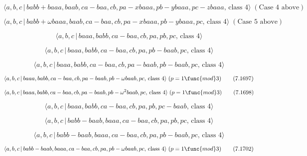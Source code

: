 \documentclass[10pt]{article}
\begin{document}
\begin{equation}
\langle a,b,c\,|\,babb+baaa,baab,ca-baa,cb,pa-xbaaa,pb-ybaaa,pc-zbaaa,\,%
\text{class }4\rangle \;(\text{Case 4 above})  \tag{7.1692}
\end{equation}

\begin{equation}
\langle a,b,c\,|\,babb+\omega baaa,baab,ca-baa,cb,pa-xbaaa,pb-ybaaa,pc,\,%
\text{class }4\rangle \;(\text{Case 5 above})  \tag{7.1693}
\end{equation}

\begin{equation}
\langle a,b,c\,|\,baaa,babb,ca-baa,cb,pa,pb,pc,\,\text{class }4\rangle 
\tag{7.1694}
\end{equation}

\begin{equation}
\langle a,b,c\,|\,baaa,babb,ca-baa,cb,pa,pb-baab,pc,\,\text{class }4\rangle 
\tag{7.1695}
\end{equation}

\begin{equation}
\langle a,b,c\,|\,baaa,babb,ca-baa,cb,pa-baab,pb-baab,pc,\,\text{class }%
4\rangle  \tag{7.1696}
\end{equation}

\begin{equation}
\langle a,b,c\,|\,baaa,babb,ca-baa,cb,pa-baab,pb-\omega baab,pc,\,\text{%
class }4\rangle \;(p=1\func{mod}3)  \tag{7.1697}
\end{equation}

\begin{equation}
\langle a,b,c\,|\,baaa,babb,ca-baa,cb,pa-baab,pb-\omega ^{2}baab,pc,\,\text{%
class }4\rangle \;(p=1\func{mod}3)  \tag{7.1698}
\end{equation}

\begin{equation}
\langle a,b,c\,|\,baaa,babb,ca-baa,cb,pa,pb,pc-baab,\,\text{class }4\rangle 
\tag{7.1699}
\end{equation}

\begin{equation}
\langle a,b,c\,|\,babb-baab,baaa,ca-baa,cb,pa,pb,pc,\,\text{class }4\rangle 
\tag{7.1700}
\end{equation}

\begin{equation}
\langle a,b,c\,|\,babb-baab,baaa,ca-baa,cb,pa,pb-baab,pc,\,\text{class }%
4\rangle  \tag{7.1701}
\end{equation}

\begin{equation}
\langle a,b,c\,|\,babb-baab,baaa,ca-baa,cb,pa,pb-\omega baab,pc,\,\text{%
class }4\rangle \;(p=1\func{mod}3)  \tag{7.1702}
\end{equation}
\end{document}
